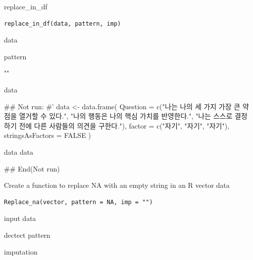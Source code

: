 \documentclass[a4paper]{book}
\begin{document}
%
\begin{Description}
replace\_in\_df
\end{Description}
%
\begin{Usage}
\begin{verbatim}
replace_in_df(data, pattern, imp)
\end{verbatim}
\end{Usage}
%
\begin{Arguments}
\begin{ldescription}
\item[\code{data}] data

\item[\code{pattern}] pattern

\item[\code{imp}] ""
\end{ldescription}
\end{Arguments}
%
\begin{Value}
data
\end{Value}
%
\begin{Examples}
\begin{ExampleCode}
\#\# Not run: 
#'
data <- data.frame(
  Question = c("나는 나의 세 가지 가장 큰
  약점을 열거할 수 있다.", "나의 행동은 나의
  핵심 가치를 반영한다.", "나는 스스로 결정하기
  전에 다른 사람들의 의견을 구한다."),
  factor = c("자기", "자기", "자기"),
  stringsAsFactors = FALSE
)

data
data %

## End(Not run)
\end{ExampleCode}
\end{Examples}
%
\begin{Description}
Create a function to replace NA with an empty string in an R vector data
\end{Description}
%
\begin{Usage}
\begin{verbatim}
Replace_na(vector, pattern = NA, imp = "")
\end{verbatim}
\end{Usage}
%
\begin{Arguments}
\begin{ldescription}
\item[\code{vector}] input data

\item[\code{pattern}] dectect pattern

\item[\code{imp}] imputation
\end{ldescription}
\end{Arguments}
\end{document}
